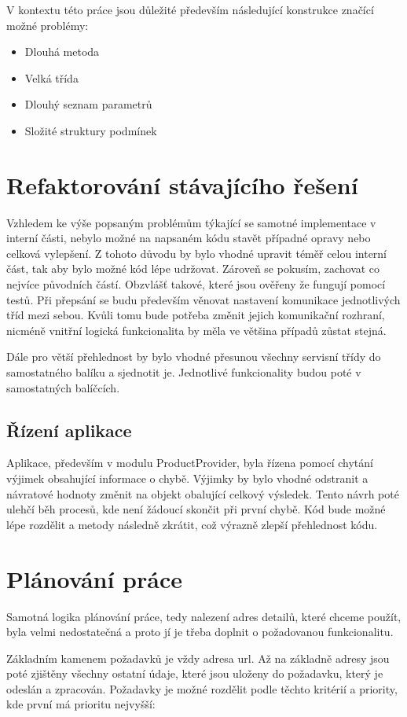 \documentclass[thesis=B,czech]{FITthesis}[2012/06/26]
\begin{document}
V kontextu této práce jsou důležité především následující konstrukce značící možné problémy: \cite{refaktoring} 
\begin{itemize}
\item Dlouhá metoda
\item Velká třída
\item Dlouhý seznam parametrů
\item Složité struktury podmínek
\end{itemize}

\section{Refaktorování stávajícího řešení}
Vzhledem ke výše popsaným problémům týkající se samotné implementace v interní části, nebylo možné na napsaném kódu stavět
případné opravy nebo celková vylepšení. Z tohoto důvodu by bylo vhodné upravit téměř celou interní část, tak aby bylo možné
kód lépe udržovat. Zároveň se pokusím, zachovat co nejvíce původních částí. Obzvlášť takové, které jsou ověřeny
že fungují pomocí testů. Při přepsání se budu především věnovat nastavení komunikace jednotlivých tříd mezi sebou.
Kvůli tomu bude potřeba změnit jejich komunikační rozhraní, nicméně vnitřní logická funkcionalita by měla ve většina případů zůstat
stejná.
\par
Dále pro větší přehlednost by bylo vhodné přesunou všechny servisní třídy do samostatného balíku a sjednotit je. Jednotlivé funkcionality
budou poté v samostatných balíčcích.


\subsection{Řízení aplikace}
Aplikace, především v modulu ProductProvider, byla řízena pomocí chytání výjimek obsahující informace o chybě. Výjimky by bylo vhodné 
odstranit a návratové hodnoty změnit na objekt obalující celkový výsledek. Tento návrh poté ulehčí běh procesů, kde není žádoucí
skončit při první chybě. Kód bude možné lépe rozdělit a metody následně zkrátit, což výrazně zlepší přehlednost kódu.

\section{Plánování práce}
Samotná logika plánování práce, tedy nalezení adres detailů, které chceme použít, byla velmi nedostatečná a proto jí je
třeba doplnit o požadovanou funkcionalitu.
\par
Základním kamenem požadavků je vždy adresa url. Až na základně adresy jsou poté zjištěny všechny ostatní údaje, které jsou uloženy do požadavku, který je odeslán a zpracován. Požadavky je možné rozdělit podle těchto kritérií a priority, kde první má prioritu nejvyšší:
\end{document}
